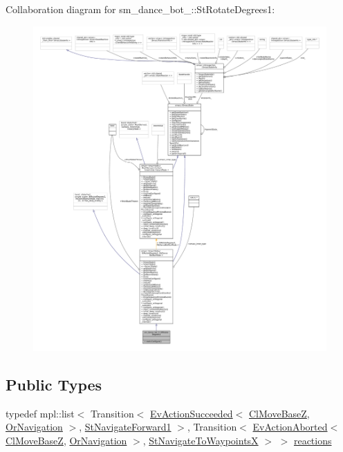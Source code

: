 Collaboration diagram for sm\+\_\+dance\+\_\+bot\+\_\+:\+:St\+Rotate\+Degrees1\+:
\nopagebreak
\begin{figure}[H]
\begin{center}
\leavevmode
\includegraphics[width=350pt]{structsm__dance__bot__2_1_1StRotateDegrees1__coll__graph}
\end{center}
\end{figure}
\subsection*{Public Types}
\begin{DoxyCompactItemize}
\item 
typedef mpl\+::list$<$ Transition$<$ \hyperlink{structsmacc_1_1default__events_1_1EvActionSucceeded}{Ev\+Action\+Succeeded}$<$ \hyperlink{classcl__move__base__z_1_1ClMoveBaseZ}{Cl\+Move\+BaseZ}, \hyperlink{classsm__dance__bot__2_1_1OrNavigation}{Or\+Navigation} $>$, \hyperlink{structsm__dance__bot__2_1_1StNavigateForward1}{St\+Navigate\+Forward1} $>$, Transition$<$ \hyperlink{structsmacc_1_1default__events_1_1EvActionAborted}{Ev\+Action\+Aborted}$<$ \hyperlink{classcl__move__base__z_1_1ClMoveBaseZ}{Cl\+Move\+BaseZ}, \hyperlink{classsm__dance__bot__2_1_1OrNavigation}{Or\+Navigation} $>$, \hyperlink{structsm__dance__bot__2_1_1StNavigateToWaypointsX}{St\+Navigate\+To\+WaypointsX} $>$ $>$ \hyperlink{structsm__dance__bot__2_1_1StRotateDegrees1_a50b1e24f473a1ab50a3e97bd7e38fdab}{reactions}
\end{DoxyCompactItemize}
